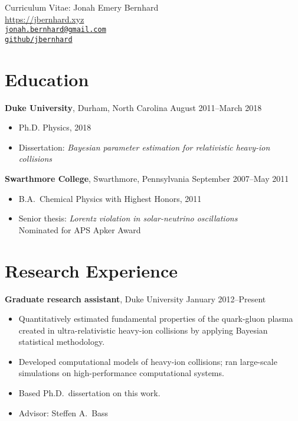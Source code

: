 \documentclass[letterpaper,10pt]{article}
\newcommand{\entry}[3]{\vspace{.5em plus .1em minus .1em}\textbf{#1}, #2 \hfill #3}
\begin{document}
\begin{center}
  \Large
  Curriculum Vitae:  Jonah Emery Bernhard \\[1ex]
  \normalsize\rm
  \url{https://jbernhard.xyz} \\
  \href{mailto:jonah.bernhard@gmail.com}{\nolinkurl{jonah.bernhard@gmail.com}} \\
  \href{https://github.com/jbernhard}{\nolinkurl{github/jbernhard}}
\end{center}


\section{Education}

\entry{Duke University}{Durham, North Carolina}{August 2011--March 2018}

\begin{itemize}
  \item Ph.D. Physics, 2018
  \item Dissertation: \emph{Bayesian parameter estimation for relativistic heavy-ion collisions}
\end{itemize}

\entry{Swarthmore College}{Swarthmore, Pennsylvania}{September 2007--May 2011}

\begin{itemize}
  \item B.A.\ Chemical Physics with Highest Honors, 2011
  \item Senior thesis: \emph{Lorentz violation in solar-neutrino oscillations} \\
    Nominated for APS Apker Award
\end{itemize}


\section{Research Experience}

\entry{Graduate research assistant}{Duke University}{January 2012--Present}

\begin{itemize}
  \item Quantitatively estimated fundamental properties of the quark-gluon plasma created in ultra-relativistic heavy-ion collisions by applying Bayesian statistical methodology.
  \item Developed computational models of heavy-ion collisions;
    ran large-scale simulations on high-performance computational systems.
  \item Based Ph.D.\ dissertation on this work.
  \item Advisor: Steffen A.\ Bass
\end{itemize}
\end{document}
